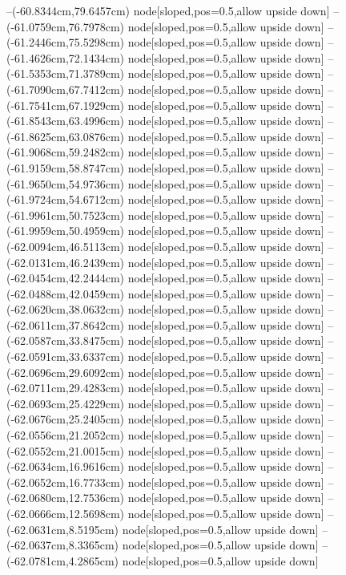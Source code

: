 --(-60.8344cm,79.6457cm) node[sloped,pos=0.5,allow upside down]{\ArrowIn}
--(-61.0759cm,76.7978cm) node[sloped,pos=0.5,allow upside down]{\ArrowIn}
--(-61.2446cm,75.5298cm) node[sloped,pos=0.5,allow upside down]{\ArrowIn}
--(-61.4626cm,72.1434cm) node[sloped,pos=0.5,allow upside down]{\ArrowIn}
--(-61.5353cm,71.3789cm) node[sloped,pos=0.5,allow upside down]{\arrowIn}
--(-61.7090cm,67.7412cm) node[sloped,pos=0.5,allow upside down]{\ArrowIn}
--(-61.7541cm,67.1929cm) node[sloped,pos=0.5,allow upside down]{\arrowIn}
--(-61.8543cm,63.4996cm) node[sloped,pos=0.5,allow upside down]{\ArrowIn}
--(-61.8625cm,63.0876cm) node[sloped,pos=0.5,allow upside down]{\arrowIn}
--(-61.9068cm,59.2482cm) node[sloped,pos=0.5,allow upside down]{\ArrowIn}
--(-61.9159cm,58.8747cm) node[sloped,pos=0.5,allow upside down]{\arrowIn}
--(-61.9650cm,54.9736cm) node[sloped,pos=0.5,allow upside down]{\ArrowIn}
--(-61.9724cm,54.6712cm) node[sloped,pos=0.5,allow upside down]{\arrowIn}
--(-61.9961cm,50.7523cm) node[sloped,pos=0.5,allow upside down]{\ArrowIn}
--(-61.9959cm,50.4959cm) node[sloped,pos=0.5,allow upside down]{\arrowIn}
--(-62.0094cm,46.5113cm) node[sloped,pos=0.5,allow upside down]{\ArrowIn}
--(-62.0131cm,46.2439cm) node[sloped,pos=0.5,allow upside down]{\arrowIn}
--(-62.0454cm,42.2444cm) node[sloped,pos=0.5,allow upside down]{\ArrowIn}
--(-62.0488cm,42.0459cm) node[sloped,pos=0.5,allow upside down]{\arrowIn}
--(-62.0620cm,38.0632cm) node[sloped,pos=0.5,allow upside down]{\ArrowIn}
--(-62.0611cm,37.8642cm) node[sloped,pos=0.5,allow upside down]{\arrowIn}
--(-62.0587cm,33.8475cm) node[sloped,pos=0.5,allow upside down]{\ArrowIn}
--(-62.0591cm,33.6337cm) node[sloped,pos=0.5,allow upside down]{\arrowIn}
--(-62.0696cm,29.6092cm) node[sloped,pos=0.5,allow upside down]{\ArrowIn}
--(-62.0711cm,29.4283cm) node[sloped,pos=0.5,allow upside down]{\arrowIn}
--(-62.0693cm,25.4229cm) node[sloped,pos=0.5,allow upside down]{\ArrowIn}
--(-62.0676cm,25.2405cm) node[sloped,pos=0.5,allow upside down]{\arrowIn}
--(-62.0556cm,21.2052cm) node[sloped,pos=0.5,allow upside down]{\ArrowIn}
--(-62.0552cm,21.0015cm) node[sloped,pos=0.5,allow upside down]{\arrowIn}
--(-62.0634cm,16.9616cm) node[sloped,pos=0.5,allow upside down]{\ArrowIn}
--(-62.0652cm,16.7733cm) node[sloped,pos=0.5,allow upside down]{\arrowIn}
--(-62.0680cm,12.7536cm) node[sloped,pos=0.5,allow upside down]{\ArrowIn}
--(-62.0666cm,12.5698cm) node[sloped,pos=0.5,allow upside down]{\arrowIn}
--(-62.0631cm,8.5195cm) node[sloped,pos=0.5,allow upside down]{\ArrowIn}
--(-62.0637cm,8.3365cm) node[sloped,pos=0.5,allow upside down]{\arrowIn}
--(-62.0781cm,4.2865cm) node[sloped,pos=0.5,allow upside down]{\ArrowIn}
